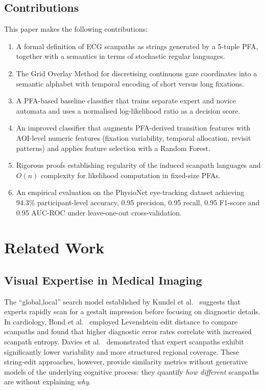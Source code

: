 \documentclass[sigconf]{acmart}
\theoremstyle{plain}
\theoremstyle{definition}
\begin{document}
\subsection{Contributions}
This paper makes the following contributions:
\begin{enumerate}
    \item A formal definition of ECG scanpaths as strings generated by a 5-tuple PFA, together with a semantics in terms of stochastic regular languages.
    \item The Grid Overlay Method for discretising continuous gaze coordinates into a semantic alphabet with temporal encoding of short versus long fixations.
    \item A PFA-based baseline classifier that trains separate expert and novice automata and uses a normalised log-likelihood ratio as a decision score.
    \item An improved classifier that augments PFA-derived transition features with AOI-level numeric features (fixation variability, temporal allocation, revisit patterns) and applies feature selection with a Random Forest.
    \item Rigorous proofs establishing regularity of the induced scanpath languages and $O(n)$ complexity for likelihood computation in fixed-size PFAs.
    \item An empirical evaluation on the PhysioNet eye-tracking dataset achieving 94.3\% participant-level accuracy, 0.95 precision, 0.95 recall, 0.95 F1-score and 0.95 AUC-ROC under leave-one-out cross-validation.
\end{enumerate}

\section{Related Work}

\subsection{Visual Expertise in Medical Imaging}
The ``global,local'' search model established by Kundel et al.~\cite{kundel1978} suggests that experts rapidly scan for a gestalt impression before focusing on diagnostic details.
In cardiology, Bond et al.~\cite{bond2018} employed Levenshtein edit distance to compare scanpaths and found that higher diagnostic error rates correlate with increased scanpath entropy.
Davies et al.~\cite{davies2012} demonstrated that expert scanpaths exhibit significantly lower variability and more structured regional coverage.
These string-edit approaches, however, provide similarity metrics without generative models of the underlying cognitive process:
they quantify \emph{how different} scanpaths are without explaining \emph{why}.
\end{document}
